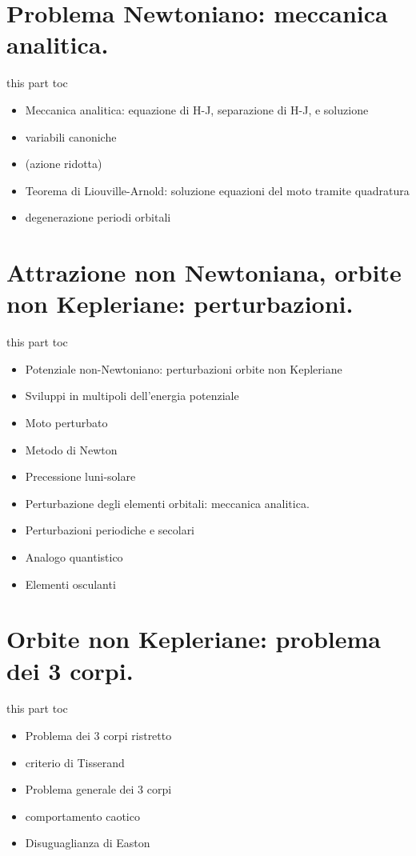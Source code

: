 \documentclass[10pt,xcolor={usenames},fleqn,mathserif,serif]{beamer}
\begin{document}
\part{Problema Newtoniano: meccanica analitica.}
\begin{frame}{this part toc}
\begin{itemize}
\item Meccanica analitica: equazione di H-J, separazione di H-J, e soluzione
\item variabili canoniche
\item (azione ridotta)
\item Teorema di Liouville-Arnold: soluzione equazioni del moto tramite quadratura
\item degenerazione periodi orbitali
\end{itemize}
\end{frame}


\part{Attrazione non Newtoniana, orbite non Kepleriane: perturbazioni.}
\begin{frame}{this part toc}
\begin{itemize}
\item Potenziale non-Newtoniano: perturbazioni orbite non Kepleriane
\item Sviluppi in multipoli dell'energia potenziale
\item Moto perturbato
\item Metodo di Newton
\item Precessione luni-solare
\item Perturbazione degli elementi orbitali: meccanica analitica.
\item Perturbazioni periodiche e secolari
\item Analogo quantistico
\item Elementi osculanti
\end{itemize}
\end{frame} 


\part{Orbite non Kepleriane: problema dei 3 corpi.}
\begin{frame}{this part toc}
\begin{itemize}
\item Problema dei 3 corpi ristretto
\item criterio di Tisserand
\item Problema generale dei 3 corpi
\item comportamento caotico
\item Disuguaglianza di Easton
\end{itemize}
\end{frame}

\end{document}
